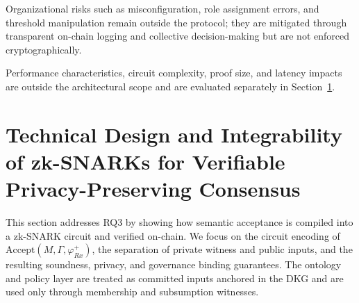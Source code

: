 \documentclass[journal]{IEEEtran}
\begin{document}
Organizational risks such as misconfiguration, role assignment errors, and threshold manipulation remain outside the protocol; they are mitigated through transparent on-chain logging and collective decision-making but are not enforced cryptographically.

Performance characteristics, circuit complexity, proof size, and latency impacts are outside the architectural scope and are evaluated separately in Section~\ref{s:rq3}.




\section{Technical Design and Integrability of zk-SNARKs for Verifiable Privacy-Preserving Consensus}
\label{s:rq3}
This section addresses RQ3 by showing how semantic acceptance is compiled into a zk-SNARK circuit and verified on-chain. We focus on the circuit encoding of $\mathrm{Accept}(M,\Gamma,\varphi^{+}_{Rx})$, the separation of private witness and public inputs, and the resulting soundness, privacy, and governance binding guarantees. The ontology and policy layer are treated as committed inputs anchored in the DKG and are used only through membership and subsumption witnesses.
\end{document}
